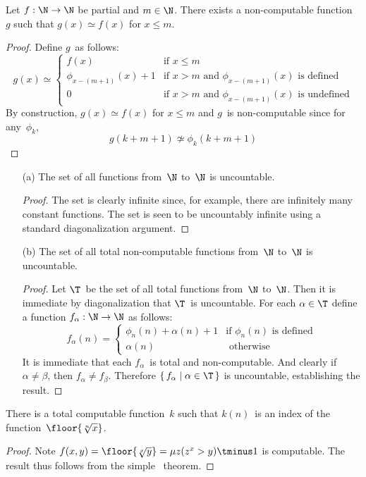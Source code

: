 Let $f:\N\to\N$ be partial and $m\in\N$. There exists a non-computable function~$g$ such that $g(x)\simeq f(x)$ for $x\le m$.
\begin{proof}
Define $g$~as follows:
$$g(x)\simeq\begin{cases}
f(x)&\text{if }x\le m\\
\phi_{x-(m+1)}(x)+1&\text{if }x>m\text{ and }\phi_{x-(m+1)}(x)\text{ is defined}\\
0&\text{if }x>m\text{ and }\phi_{x-(m+1)}(x)\text{ is undefined}
\end{cases}$$
By construction, $g(x)\simeq f(x)$ for $x\le m$ and $g$~is non-computable since for any~$\phi_k$,
$$g(k+m+1)\not\simeq\phi_k(k+m+1)$$
\end{proof}


\begin{enumerate}[itemsep=0pt]
    \item[(a)] The set of all functions from~$\N$ to~$\N$ is uncountable.
    \begin{proof}
    The set is clearly infinite since, for example, there are infinitely many constant functions. The set is seen to be uncountably infinite using a standard diagonalization argument.
    \end{proof}
    \item[(b)] The set of all total non-computable functions from~$\N$ to~$\N$ is uncountable.
    \begin{proof}
    Let $\T$~be the set of all total functions from~$\N$ to~$\N$. Then it is immediate by diagonalization that $\T$~is uncountable. For each $\alpha\in\T$ define a function $f_{\alpha}:\N\to\N$ as follows:
    $$f_{\alpha}(n)=\begin{cases}
    \phi_n(n)+\alpha(n)+1&\text{if }\phi_n(n)\text{ is defined}\\
    \alpha(n)&\text{ otherwise}
    \end{cases}$$
    It is immediate that each $f_{\alpha}$~is total and non-computable. And clearly if $\alpha\ne\beta$, then $f_{\alpha}\ne f_{\beta}$. Therefore $\{\,f_{\alpha}\mid\alpha\in\T\,\}$ is uncountable, establishing the result.
    \end{proof}
    \end{enumerate}
    



    There is a total computable function~$k$ such that $k(n)$~is an index of the function~$\floor{\sqrt[n]{x}}$.
\begin{proof}
Note $f(x,y)=\floor{\sqrt[x]{y}}=\mu z(z^x>y)\tminus 1$ is computable. The result thus follows from the simple \smn\ theorem.
\end{proof}


